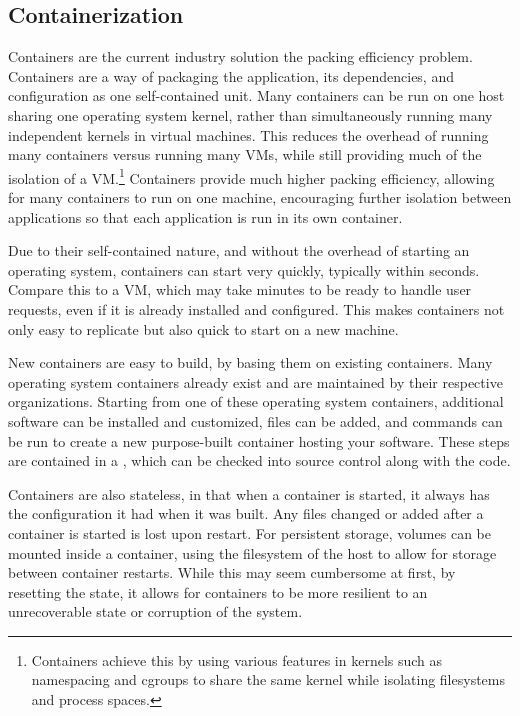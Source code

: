 \documentclass[11pt,twoside]{article}
\begin{document}
\subsection{Containerization}

Containers are the current industry solution the packing efficiency problem.  Containers are a way of packaging
the application, its dependencies, and configuration as one self-contained unit.  Many containers can be
run on one host sharing one operating system kernel, rather than simultaneously
running many independent kernels in virtual machines.  This reduces the overhead of running many containers
versus running many VMs, while still providing much of the isolation of a VM.\footnote{Containers 
achieve this by using various features in kernels such as namespacing and cgroups
to share the same kernel while isolating filesystems and process spaces.}  Containers
provide much higher packing efficiency, allowing for many containers to run on one machine,
encouraging further isolation between applications so that each application is run in its
own container.

Due to their self-contained nature, and without the overhead of
starting an operating system, containers can start very quickly, typically within seconds.
Compare this to a VM, which may take minutes to be ready to handle user requests, even if
it is already installed and configured. This makes containers not only easy to replicate but
also quick to start on a new machine.

New containers are easy to build, by basing them on existing containers.  Many operating
system containers already exist and are maintained by their respective organizations.
Starting from one of these operating system containers, additional software can be
installed and customized, files can be added, and commands can be run to create a
new purpose-built container hosting your software.  These steps are contained in a
, which can be checked into source control along with the code.

Containers are also stateless, in that when a container is started, it always
has the configuration it had when it was built.  Any files changed or added
after a container is started is lost upon restart.  For persistent storage,
volumes can be mounted inside a container, using the filesystem of the host
to allow for storage between container restarts.  While this may seem cumbersome
at first, by resetting the state, it allows for containers to be more resilient
to an unrecoverable state or corruption of the system.
\end{document}
